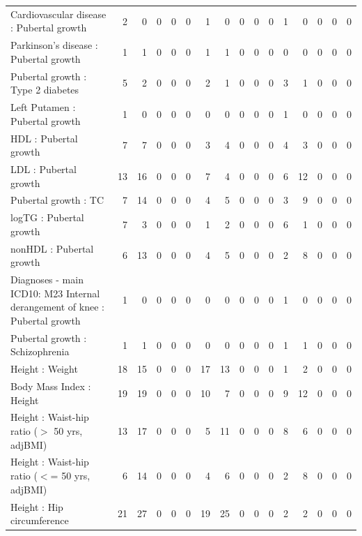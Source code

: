 \begin{table}[ht]
\begin{tabular}{lrrrrrrrrrrrrrrr}
  Cardiovascular disease : Pubertal growth  &   2 &   0 &   0 &   0 &   0 &   1 &   0 &   0 &   0 &   0 &   1 &   0 &   0 &   0 &   0 \\ 
  Parkinson's disease : Pubertal growth  &   1 &   1 &   0 &   0 &   0 &   1 &   1 &   0 &   0 &   0 &   0 &   0 &   0 &   0 &   0 \\ 
  Pubertal growth  : Type 2 diabetes &   5 &   2 &   0 &   0 &   0 &   2 &   1 &   0 &   0 &   0 &   3 &   1 &   0 &   0 &   0 \\ 
  Left Putamen : Pubertal growth  &   1 &   0 &   0 &   0 &   0 &   0 &   0 &   0 &   0 &   0 &   1 &   0 &   0 &   0 &   0 \\ 
  HDL : Pubertal growth  &   7 &   7 &   0 &   0 &   0 &   3 &   4 &   0 &   0 &   0 &   4 &   3 &   0 &   0 &   0 \\ 
  LDL : Pubertal growth  &  13 &  16 &   0 &   0 &   0 &   7 &   4 &   0 &   0 &   0 &   6 &  12 &   0 &   0 &   0 \\ 
  Pubertal growth  : TC &   7 &  14 &   0 &   0 &   0 &   4 &   5 &   0 &   0 &   0 &   3 &   9 &   0 &   0 &   0 \\ 
  logTG : Pubertal growth  &   7 &   3 &   0 &   0 &   0 &   1 &   2 &   0 &   0 &   0 &   6 &   1 &   0 &   0 &   0 \\ 
  nonHDL : Pubertal growth  &   6 &  13 &   0 &   0 &   0 &   4 &   5 &   0 &   0 &   0 &   2 &   8 &   0 &   0 &   0 \\ 
  Diagnoses - main ICD10: M23 Internal derangement of knee : Pubertal growth  &   1 &   0 &   0 &   0 &   0 &   0 &   0 &   0 &   0 &   0 &   1 &   0 &   0 &   0 &   0 \\ 
  Pubertal growth  : Schizophrenia &   1 &   1 &   0 &   0 &   0 &   0 &   0 &   0 &   0 &   0 &   1 &   1 &   0 &   0 &   0 \\ 
  Height  : Weight  &  18 &  15 &   0 &   0 &   0 &  17 &  13 &   0 &   0 &   0 &   1 &   2 &   0 &   0 &   0 \\ 
  Body Mass Index  : Height  &  19 &  19 &   0 &   0 &   0 &  10 &   7 &   0 &   0 &   0 &   9 &  12 &   0 &   0 &   0 \\ 
  Height  : Waist-hip ratio ($>$ 50 yrs, adjBMI) &  13 &  17 &   0 &   0 &   0 &   5 &  11 &   0 &   0 &   0 &   8 &   6 &   0 &   0 &   0 \\ 
  Height  : Waist-hip ratio ($<$= 50 yrs, adjBMI) &   6 &  14 &   0 &   0 &   0 &   4 &   6 &   0 &   0 &   0 &   2 &   8 &   0 &   0 &   0 \\ 
  Height  : Hip circumference  &  21 &  27 &   0 &   0 &   0 &  19 &  25 &   0 &   0 &   0 &   2 &   2 &   0 &   0 &   0 \\ 

\end{tabular}
\end{table}
